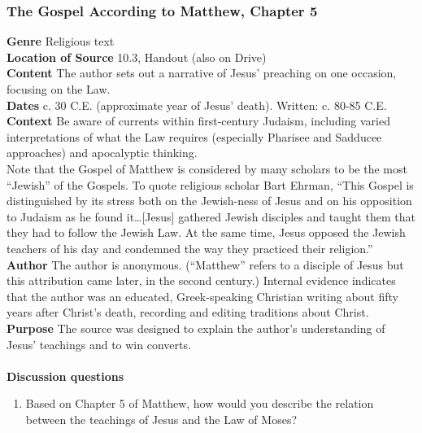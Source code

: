 \documentclass{article}
\begin{document}
\subsubsection*{The Gospel According to Matthew, Chapter 5}
\textbf{Genre}
Religious text \\
\textbf{Location of Source}
10.3, Handout (also on Drive) \\
\textbf{Content}
The author sets out a narrative of Jesus’ preaching on one occasion, focusing on the Law. \\
\textbf{Dates}
c. 30 C.E. (approximate year of Jesus’ death). Written: c. 80-85 C.E. \\
\textbf{Context}
Be aware of currents within first-century Judaism, including varied interpretations of what the Law requires (especially Pharisee and Sadducee approaches) and apocalyptic thinking. \\
Note that the Gospel of Matthew is considered by many scholars to be the most “Jewish” of the Gospels. To quote religious scholar Bart Ehrman, “This Gospel is distinguished by its stress both on the Jewish-ness of Jesus and on his opposition to Judaism as he found it…[Jesus] gathered Jewish disciples and taught them that they had to follow the Jewish Law. At the same time, Jesus opposed the Jewish teachers of his day and condemned the way they practiced their religion.” \\
\textbf{Author}
The author is anonymous. (“Matthew” refers to a disciple of Jesus but this attribution came later, in the second century.) Internal evidence indicates that the author was an educated, Greek-speaking Christian writing about fifty years after Christ’s death, recording and editing traditions about Christ. \\
\textbf{Purpose}
The source was designed to explain the author’s understanding of Jesus’ teachings and to win converts. \\
\\
\textbf{Discussion questions}
\begin{enumerate}
  \item Based on Chapter 5 of Matthew, how would you describe the relation between the teachings of Jesus and the Law of Moses?
\end{enumerate}
\end{document}
